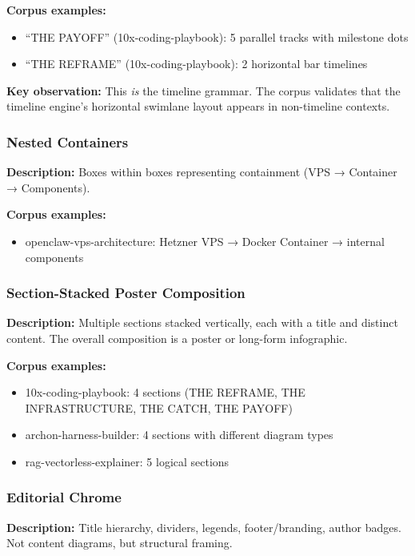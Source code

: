 \textbf{Corpus examples:}
\begin{itemize}
  \item ``THE PAYOFF'' (10x-coding-playbook): 5 parallel tracks with milestone dots
  \item ``THE REFRAME'' (10x-coding-playbook): 2 horizontal bar timelines
\end{itemize}

\textbf{Key observation:} This \emph{is} the timeline grammar. The corpus validates that the timeline engine's horizontal swimlane layout appears in non-timeline contexts.

\subsubsection{Nested Containers}

\textbf{Description:} Boxes within boxes representing containment (VPS → Container → Components).

\textbf{Corpus examples:}
\begin{itemize}
  \item openclaw-vps-architecture: Hetzner VPS → Docker Container → internal components
\end{itemize}

\subsubsection{Section-Stacked Poster Composition}

\textbf{Description:} Multiple sections stacked vertically, each with a title and distinct content. The overall composition is a poster or long-form infographic.

\textbf{Corpus examples:}
\begin{itemize}
  \item 10x-coding-playbook: 4 sections (THE REFRAME, THE INFRASTRUCTURE, THE CATCH, THE PAYOFF)
  \item archon-harness-builder: 4 sections with different diagram types
  \item rag-vectorless-explainer: 5 logical sections
\end{itemize}

\subsubsection{Editorial Chrome}

\textbf{Description:} Title hierarchy, dividers, legends, footer/branding, author badges. Not content diagrams, but structural framing.

